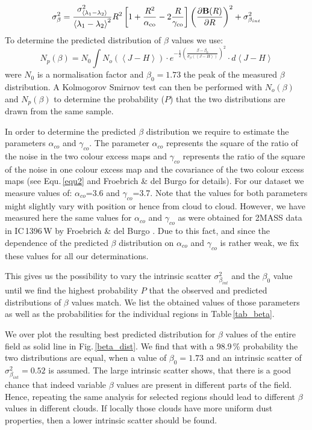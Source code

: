 \documentclass[useAMS,usenatbib]{mn2e}
\begin{document}
\begin{equation}
\sigma^2_\beta = \frac{\sigma^2_{\left< \lambda_1 - \lambda_2 \right>}}{\left<
\lambda_1 - \lambda_2 \right>^2} R^2 \left[ 1 + \frac{R^2}{\alpha_{\rm co}} - 2
\frac{R}{\gamma_{\rm co}} \right] \left( \frac{\partial {\bf B}(R)}{\partial R}
\right)^2 + \sigma^2_{\beta_{int}}
\label{equ2}
\end{equation}
To determine the predicted distribution of $\beta$ values we use:
\begin{equation}
N_{p}(\beta) = N_0 \int N_{o}(\left< J-H \right>) \cdot e^{ - \frac{1}{2} \left(
\frac{\beta - \beta_0}{\sigma_\beta(\left< J-H \right>)} \right)^2} \cdot d
\left< J-H \right> 
\label{equ3}
\end{equation}
were $N_0$ is a normalisation factor and $\beta_0 = 1.73$ the peak of the
measured $\beta$ distribution. A Kolmogorov Smirnov test can then be performed
with $N_{o}(\beta)$ and $N_{p}(\beta)$ to determine the probability ($P$)
that the two distributions are drawn from the same sample.

In order to determine the predicted $\beta$ distribution we require to estimate
the parameters $\alpha_{co}$ and $\gamma_{co}$. The parameter $\alpha_{co}$
represents the square of the ratio of the noise in the two colour excess maps
and $\gamma_{co}$ represents the ratio of the square of the noise in one colour
excess map and the covariance of the two colour excess maps (see
Equ.\,\ref{equ2} and Froebrich \& del Burgo \cite{2006MNRAS.369.1901F} for
details). For our dataset we measure values of: $\alpha_{co}$=3.6 and
$\gamma_{co}$=3.7. Note that the values for both parameters might slightly vary
with position or hence from cloud to cloud. However, we have measured here the
same values for $\alpha_{co}$ and $\gamma_{co}$ as were obtained for 2MASS data
in IC\,1396\,W by Froebrich \& del Burgo \cite{2006MNRAS.369.1901F}. Due to this
fact, and since the dependence of the predicted $\beta$ distribution on
$\alpha_{co}$ and $\gamma_{co}$ is rather weak, we fix these values for all our
determinations.

This gives us the possibility to vary the intrinsic scatter
$\sigma^2_{\beta_{int}}$ and the $\beta_0$ value until we find the highest
probability $P$ that the observed and predicted distributions of $\beta$ values
match. We list the obtained values of those parameters as well as the
probabilities for the individual regions in Table\,\ref{tab_beta}.

We over plot the resulting best predicted distribution for $\beta$ values of the
entire field as solid line in Fig.\,\ref{beta_dist}. We find that with a
98.9\,\% probability the two distributions are equal, when a value of $\beta_0 =
1.73$ and an intrinsic scatter of $\sigma^2_{\beta_{int}} = 0.52$ is assumed.
The large intrinsic scatter shows, that there is a good chance that indeed
variable $\beta$ values are present in different parts of the field. Hence,
repeating the same analysis for selected regions should lead to different
$\beta$ values in different clouds. If locally those clouds have more uniform
dust properties, then a lower intrinsic scatter should be found.
\end{document}
